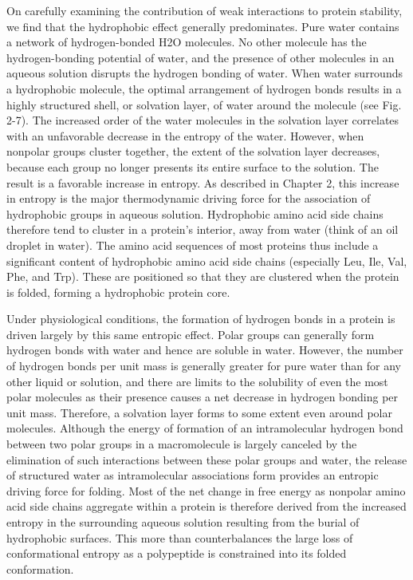 On carefully examining the contribution of weak interactions to protein stability, we find that the hydrophobic effect generally predominates. Pure water contains a network of hydrogen-bonded H2O molecules. No other molecule has the hydrogen-bonding potential of water, and the presence of other molecules in an aqueous solution disrupts the hydrogen bonding of water. When water surrounds a hydrophobic molecule, the optimal arrangement of hydrogen bonds results in a highly structured shell, or solvation layer, of water around the molecule (see Fig. 2-7). The increased order of the water molecules in the solvation layer correlates with an unfavorable decrease in the entropy of the water. However, when nonpolar groups cluster together, the extent of the solvation layer decreases, because each group no longer presents its entire surface to the solution. The result is a favorable increase in entropy. As described in Chapter 2, this increase in entropy is the major thermodynamic driving force for the association of hydrophobic groups in aqueous solution. Hydrophobic amino acid side chains therefore tend to cluster in a protein’s interior, away from water (think of an oil droplet in water). The amino acid sequences of most proteins thus include a significant content of hydrophobic amino acid side chains (especially Leu, Ile, Val, Phe, and Trp). These are positioned so that they are clustered when the protein is folded, forming a hydrophobic protein core. 

Under physiological conditions, the formation of hydrogen bonds in a protein is driven largely by this same entropic effect. Polar groups can generally form hydrogen bonds with water and hence are soluble in water. However, the number of hydrogen bonds per unit mass is generally greater for pure water than for any other liquid or solution, and there are limits to the solubility of even the most polar molecules as their presence causes a net decrease in hydrogen bonding per unit mass. Therefore, a solvation layer forms to some extent even around polar molecules. Although the energy of formation of an intramolecular hydrogen bond between two polar groups in a macromolecule is largely canceled by the elimination of such interactions between these polar groups and water, the release of structured water as intramolecular associations form provides an entropic driving force for folding. Most of the net change in free energy as nonpolar amino acid side chains aggregate within a protein is therefore derived from the increased entropy in the surrounding aqueous solution resulting from the burial of hydrophobic surfaces. This more than counterbalances the large loss of conformational entropy as a polypeptide is constrained into its folded conformation. 

